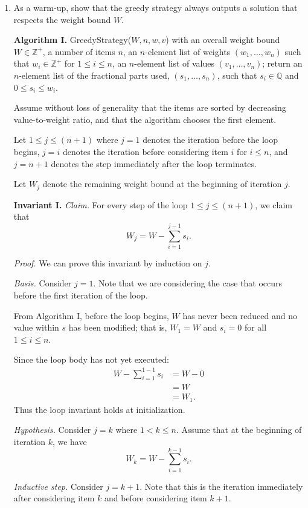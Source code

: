 \begin{enumerate}
    \item As a warm-up, show that the greedy strategy always outputs a solution that respects the weight bound $W$.
\begin{solution}

\textbf{Algorithm I. }{\sc GreedyStrategy($W,n,w,v$)} with an overall weight bound $W\in\mathbb{Z}^+$, a number of items $n$, an $n$-element list of weights $(w_1,\dots,w_n)$ such that $w_i\in\mathbb{Z}^+$ for $1\leq i\leq n$, an $n$-element list of values $(v_1,\dots,v_n)$; return an $n$-element list of the fractional parts used, $(s_1,\dots,s_n)$, such that $s_i\in\mathbb{Q}$ and $0\leq s_i\leq w_i$. 

Assume without loss of generality that the items are sorted by decreasing value-to-weight ratio, and that the algorithm chooses the first element.

Let $1\leq j\leq(n+1)$ where $j=1$ denotes the iteration before the loop begins, $j=i$ denotes the iteration before considering item $i$ for $i\leq n$, and $j=n+1$ denotes the step immediately after the loop terminates.

Let $W_j$ denote the remaining weight bound at the beginning of iteration $j$. 

\textbf{Invariant I. }\textit{Claim. }
For every step of the loop $1\leq j\leq(n+1)$, we claim that \[W_j=W-\sum_{i=1}^{j-1}{s_i}.\] 

\textit{Proof. }We can prove this invariant by induction on $j$.

\textit{Basis. }Consider $j=1$. Note that we are considering the case that occurs before the first iteration of the loop. 

From Algorithm I, before the loop begins, $W$ has never been reduced and no value within $s$ has been modified; that is, $W_1=W$ and $s_i=0$ for all $1\leq i\leq n$.

Since the loop body has not yet executed:
\begin{align*}
W-\sum_{i=1}^{1-1}{s_i}&=W-0\\
&=W\\
&=W_1.
\end{align*}
Thus the loop invariant holds at initialization.

\textit{Hypothesis. }Consider $j=k$ where $1<k\leq n$. Assume that at the beginning of iteration $k$, we have \[W_k=W-\sum_{i=1}^{k-1}s_i.\]

\textit{Inductive step. }Consider $j=k+1$. Note that this is the iteration immediately after considering item $k$ and before considering item $k+1$. 


\end{solution}
\end{enumerate}
